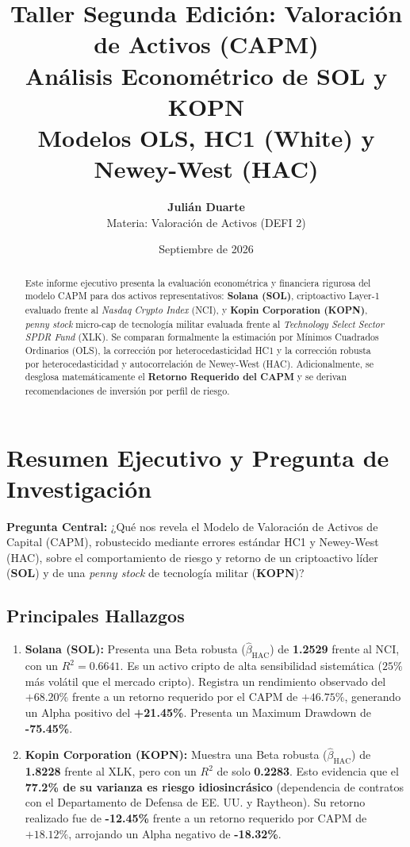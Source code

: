 \documentclass[11pt,a4paper]{article}
\title{\vspace{-1.5cm}\textbf{\Large Taller Segunda Edición: Valoración de Activos (CAPM)}\\\Large\textbf{Análisis Econométrico de SOL y KOPN}\\\large\textmd{Modelos OLS, HC1 (White) y Newey-West (HAC)}}
\author{\textbf{Julián Duarte}\\Materia: Valoración de Activos (DEFI 2)}
\date{Septiembre de 2026}
\begin{document}
\maketitle

\begin{abstract}
Este informe ejecutivo presenta la evaluación econométrica y financiera rigurosa del modelo CAPM para dos activos representativos: \textbf{Solana (SOL)}, criptoactivo Layer-1 evaluado frente al \textit{Nasdaq Crypto Index} (NCI), y \textbf{Kopin Corporation (KOPN)}, \textit{penny stock} micro-cap de tecnología militar evaluada frente al \textit{Technology Select Sector SPDR Fund} (XLK). Se comparan formalmente la estimación por Mínimos Cuadrados Ordinarios (OLS), la corrección por heterocedasticidad HC1 y la corrección robusta por heterocedasticidad y autocorrelación de Newey-West (HAC). Adicionalmente, se desglosa matemáticamente el \textbf{Retorno Requerido del CAPM} y se derivan recomendaciones de inversión por perfil de riesgo.
\end{abstract}

\section{Resumen Ejecutivo y Pregunta de Investigación}
\textbf{Pregunta Central:} ¿Qué nos revela el Modelo de Valoración de Activos de Capital (CAPM), robustecido mediante errores estándar HC1 y Newey-West (HAC), sobre el comportamiento de riesgo y retorno de un criptoactivo líder (\textbf{SOL}) y de una \textit{penny stock} de tecnología militar (\textbf{KOPN})?

\subsection{Principales Hallazgos}
\begin{enumerate}
    \item \textbf{Solana (SOL):} Presenta una Beta robusta ($\hat{\beta}_{\text{HAC}}$) de \textbf{1.2529} frente al NCI, con un $R^2 = 0.6641$. Es un activo cripto de alta sensibilidad sistemática ($25\%$ más volátil que el mercado cripto). Registra un rendimiento observado del $+68.20\%$ frente a un retorno requerido por el CAPM de $+46.75\%$, generando un Alpha positivo del \textbf{+21.45\%}. Presenta un Maximum Drawdown de \textbf{-75.45\%}.
    \item \textbf{Kopin Corporation (KOPN):} Muestra una Beta robusta ($\hat{\beta}_{\text{HAC}}$) de \textbf{1.8228} frente al XLK, pero con un $R^2$ de solo \textbf{0.2283}. Esto evidencia que el \textbf{77.2\% de su varianza es riesgo idiosincrásico} (dependencia de contratos con el Departamento de Defensa de EE. UU. y Raytheon). Su retorno realizado fue de \textbf{-12.45\%} frente a un retorno requerido por CAPM de $+18.12\%$, arrojando un Alpha negativo de \textbf{-18.32\%}.
\end{enumerate}
\end{document}
